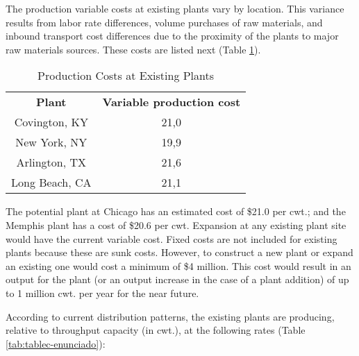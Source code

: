 \documentclass[12pt,a4paper]{article}
\begin{document}
The production variable costs at existing plants vary by location.
This variance results from labor rate differences, volume purchases of raw materials, and inbound transport cost differences due to the proximity of the plants to major raw materials sources.
These costs are listed next (Table \ref{tab:tableb-enunciado}).

\begin{table}[!h]
    \centering
    \caption{Production Costs at Existing Plants}
    \label{tab:tableb-enunciado}
    \begin{tabular}{|c|c|}
    \hline
    \textbf{Plant} & \textbf{Variable production cost} \\
    Covington, KY  & 21,0                              \\
    New York, NY   & 19,9                              \\
    Arlington, TX  & 21,6                              \\
    Long Beach, CA & 21,1                              \\
    \hline
\end{tabular}
\end{table}

The potential plant at Chicago has an estimated cost of \$21.0 per cwt.;
and the Memphis plant has a cost of \$20.6 per cwt.
Expansion at any existing plant site would have the current variable cost.
Fixed costs are not included for existing plants because these are sunk costs.
However, to construct a new plant or expand an existing one would cost a minimum of \$4 million.
This cost would result in an output for the plant (or an output increase in the case of a plant addition) of up to 1 million cwt. per year for the near future.

According to current distribution patterns, the existing plants are producing, relative to throughput capacity (in cwt.), at the following rates (Table \ref{tab:tablec-enunciado}):
\end{document}

